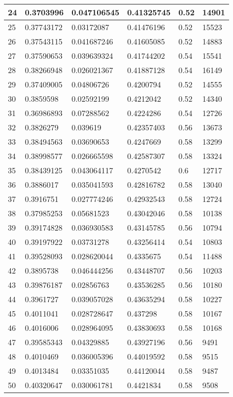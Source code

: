 \begin{longtable}{|l|l|l|l|l|l|}
24 & 0.3703996 & 0.047106545 & 0.41325745 & 0.52 & 14901 \\ \hline 
25 & 0.37743172 & 0.03172087 & 0.41476196 & 0.52 & 15523 \\ \hline 
26 & 0.37543115 & 0.041687246 & 0.41605085 & 0.52 & 14883 \\ \hline 
27 & 0.37590653 & 0.039639324 & 0.41744202 & 0.54 & 15541 \\ \hline 
28 & 0.38266948 & 0.026021367 & 0.41887128 & 0.54 & 16149 \\ \hline 
29 & 0.37409005 & 0.04806726 & 0.4200794 & 0.52 & 14555 \\ \hline 
30 & 0.3859598 & 0.02592199 & 0.4212042 & 0.52 & 14340 \\ \hline 
31 & 0.36986893 & 0.07288562 & 0.4224286 & 0.54 & 12726 \\ \hline 
32 & 0.3826279 & 0.039619 & 0.42357403 & 0.56 & 13673 \\ \hline 
33 & 0.38494563 & 0.03690653 & 0.4247669 & 0.58 & 13299 \\ \hline 
34 & 0.38998577 & 0.026665598 & 0.42587307 & 0.58 & 13324 \\ \hline 
35 & 0.38439125 & 0.043064117 & 0.4270542 & 0.6 & 12717 \\ \hline 
36 & 0.3886017 & 0.035041593 & 0.42816782 & 0.58 & 13040 \\ \hline 
37 & 0.3916751 & 0.027774246 & 0.42932543 & 0.58 & 12724 \\ \hline 
38 & 0.37985253 & 0.05681523 & 0.43042046 & 0.58 & 10138 \\ \hline 
39 & 0.39174828 & 0.036930583 & 0.43145785 & 0.56 & 10794 \\ \hline 
40 & 0.39197922 & 0.03731278 & 0.43256414 & 0.54 & 10803 \\ \hline 
41 & 0.39528093 & 0.028620044 & 0.4335675 & 0.54 & 11488 \\ \hline 
42 & 0.3895738 & 0.046444256 & 0.43448707 & 0.56 & 10203 \\ \hline 
43 & 0.39876187 & 0.02856763 & 0.43536285 & 0.56 & 10180 \\ \hline 
44 & 0.3961727 & 0.039057028 & 0.43635294 & 0.58 & 10227 \\ \hline 
45 & 0.4011041 & 0.028728647 & 0.437298 & 0.58 & 10167 \\ \hline 
46 & 0.4016006 & 0.028964095 & 0.43830693 & 0.58 & 10168 \\ \hline 
47 & 0.39585343 & 0.04329885 & 0.43927196 & 0.56 & 9491 \\ \hline 
48 & 0.4010469 & 0.036005396 & 0.44019592 & 0.58 & 9515 \\ \hline 
49 & 0.4013484 & 0.03351035 & 0.44120044 & 0.58 & 9487 \\ \hline 
50 & 0.40320647 & 0.030061781 & 0.4421834 & 0.58 & 9508 \\ \hline 
\end{longtable}